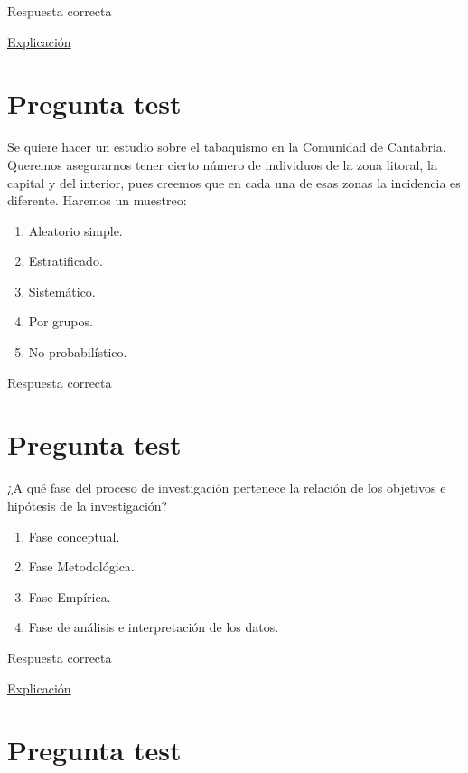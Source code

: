 \documentclass[
]{book}
\providecommand{\tightlist}{%
  \setlength{\itemsep}{0pt}\setlength{\parskip}{0pt}}
\begin{document}
Respuesta correcta

\href{https://1fjmanzano.github.io/bioestadistica/tipos-de-variables.html}{Explicación}

\hypertarget{pregunta-test-42}{%
\section{Pregunta test}\label{pregunta-test-42}}

Se quiere hacer un estudio sobre el tabaquismo en la Comunidad de Cantabria. Queremos asegurarnos tener cierto número de individuos de la zona litoral, la capital y del interior, pues creemos que en cada una de esas zonas la incidencia es diferente. Haremos un muestreo:

\begin{enumerate}
\def\labelenumi{\alph{enumi})}
\tightlist
\item
  Aleatorio simple.
\item
  Estratificado.
\item
  Sistemático.
\item
  Por grupos.
\item
  No probabilístico.
\end{enumerate}

Respuesta correcta

\hypertarget{pregunta-test-43}{%
\section{Pregunta test}\label{pregunta-test-43}}

¿A qué fase del proceso de investigación pertenece la relación de los objetivos e hipótesis de la investigación?

\begin{enumerate}
\def\labelenumi{\alph{enumi})}
\tightlist
\item
  Fase conceptual.
\item
  Fase Metodológica.
\item
  Fase Empírica.
\item
  Fase de análisis e interpretación de los datos.
\end{enumerate}

Respuesta correcta

\href{https://www.salusplay.com/apuntes/apuntes-metodologia-de-la-investigacion/tema-4-el-proceso-de-investigacion-fases-de-realizacion-de-una-investigacion-cientifica/2}{Explicación}

\hypertarget{pregunta-test-44}{%
\section{Pregunta test}\label{pregunta-test-44}}
\end{document}
